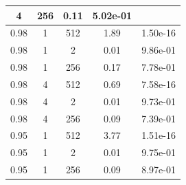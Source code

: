 \documentclass{../myclass}
\begin{document}
\begin{table}[ht]
\begin{tabular}{ccccc}
    \multicolumn{1}{c|}{4}     & \multicolumn{1}{c|}{256}
    & \multicolumn{1}{c|}{0.11}         & \multicolumn{1}{c|}{5.02e-01}
    \\ \hline
    \multicolumn{1}{|c|}{0.98}                                                              &
    \multicolumn{1}{c|}{1}     & \multicolumn{1}{c|}{512}
    & \multicolumn{1}{c|}{1.89}         & \multicolumn{1}{c|}{1.50e-16}
    \\ \hline
    \multicolumn{1}{|c|}{0.98}                                                              &
    \multicolumn{1}{c|}{1}     & \multicolumn{1}{c|}{2}
    & \multicolumn{1}{c|}{0.01}         & \multicolumn{1}{c|}{9.86e-01}
    \\ \hline
    \multicolumn{1}{|c|}{0.98}                                                              &
    \multicolumn{1}{c|}{1}     & \multicolumn{1}{c|}{256}
    & \multicolumn{1}{c|}{0.17}         & \multicolumn{1}{c|}{7.78e-01}
    \\ \hline
    \multicolumn{1}{|c|}{0.98}                                                              &
    \multicolumn{1}{c|}{4}     & \multicolumn{1}{c|}{512}
    & \multicolumn{1}{c|}{0.69}         & \multicolumn{1}{c|}{7.58e-16}
    \\ \hline
    \multicolumn{1}{|c|}{0.98}                                                              &
    \multicolumn{1}{c|}{4}     & \multicolumn{1}{c|}{2}
    & \multicolumn{1}{c|}{0.01}         & \multicolumn{1}{c|}{9.73e-01}
    \\ \hline
    \multicolumn{1}{|c|}{0.98}                                                              &
    \multicolumn{1}{c|}{4}     & \multicolumn{1}{c|}{256}
    & \multicolumn{1}{c|}{0.09}         & \multicolumn{1}{c|}{7.39e-01}
    \\ \hline
    \multicolumn{1}{|c|}{0.95}                                                              &
    \multicolumn{1}{c|}{1}     & \multicolumn{1}{c|}{512}
    & \multicolumn{1}{c|}{3.77}         & \multicolumn{1}{c|}{1.51e-16}
    \\ \hline
    \multicolumn{1}{|c|}{0.95}                                                              &
    \multicolumn{1}{c|}{1}     & \multicolumn{1}{c|}{2}
    & \multicolumn{1}{c|}{0.01}         & \multicolumn{1}{c|}{9.75e-01}
    \\ \hline
    \multicolumn{1}{|c|}{0.95}                                                              &
    \multicolumn{1}{c|}{1}     & \multicolumn{1}{c|}{256}
    & \multicolumn{1}{c|}{0.09}         & \multicolumn{1}{c|}{8.97e-01}

\end{tabular}
\end{table}
\end{document}
